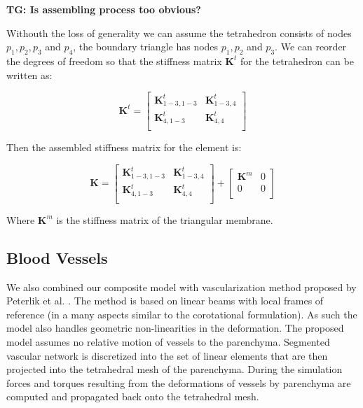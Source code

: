 \documentclass{llncs}
\newcommand{\TG}[1]{{\color{blue}\textbf{TG: #1}}}
\newcommand{\Mat}[1]{\mathbf{#1}}
\begin{document}
\TG{Is assembling process too obvious?}

Withouth the loss of generality we can assume the tetrahedron consists of
nodes $p_1, p_2, p_3$ and $p_4$, the boundary triangle has nodes $p_1, p_2$
and $p_3$. We can reorder the degrees of freedom so that the stiffness
matrix $\Mat{K}^t$ for the tetrahedron can be written as:

\begin{equation}
  \Mat{K}^t = \left[\begin{array}{c|c}
      \Mat{K}^t_{1-3,1-3} & \Mat{K}^t_{1-3,4} \\
      \hline
      \Mat{K}^t_{4,1-3} & \Mat{K}^t_{4,4} \\
  \end{array}\right]
\end{equation}

Then the assembled stiffness matrix for the element is:

\begin{equation}
  \Mat{K} = \left[\begin{array}{c|c}
      \Mat{K}^t_{1-3,1-3} & \Mat{K}^t_{1-3,4} \\
      \hline
      \Mat{K}^t_{4,1-3} & \Mat{K}^t_{4,4} \\
  \end{array}\right]
  +
  \left[\begin{array}{c|c}
      \Mat{K}^m & 0 \\
      \hline
      0 & 0 \\
  \end{array}\right]
\end{equation}

Where $\Mat{K}^m$ is the stiffness matrix of the triangular membrane.


\subsection{Blood Vessels} %

We also combined our composite model with vascularization method proposed
by Peterlik et al. \cite{Peterlik2012}. The method is based on linear beams
with local frames of reference (in a many aspects similar to the
corotational formulation). As such the model also handles geometric
non-linearities in the deformation. The proposed model assumes no relative
motion of vessels to the parenchyma. Segmented vascular network is
discretized into the set of linear elements that are then projected into
the tetrahedral mesh of the parenchyma. During the simulation forces and
torques resulting from the deformations of vessels by parenchyma are
computed and propagated back onto the tetrahedral mesh.
\end{document}
